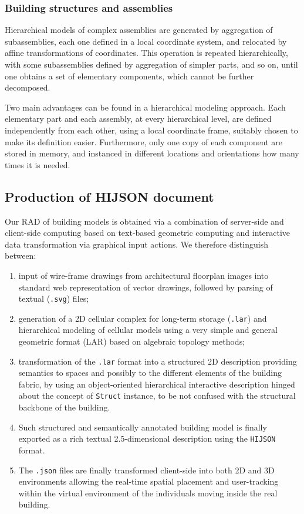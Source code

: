 \documentclass[]{egpubl}
\begin{document}
\subsubsection*{Building structures and assemblies}

Hierarchical models of complex assemblies are generated by aggregation
of subassemblies, each one defined in a local coordinate system, and
relocated by affine transformations of coordinates.  This operation
is repeated hierarchically, with some subassemblies defined by
aggregation of simpler parts, and so on, until one obtains a set of
elementary components, which cannot be further decomposed.

Two main advantages can be found in a hierarchical modeling approach. Each elementary part and each assembly, at every hierarchical level, are defined independently from each other, using a local coordinate frame, suitably chosen to make its definition easier. Furthermore, only one copy of each component are stored in memory, and instanced in different locations and orientations how many times it is needed.


\subsection{Production of HIJSON document}

Our RAD of building models is 
obtained via a combination of server-side and client-side computing
based on text-based geometric computing and interactive data 
transformation via graphical input actions. We therefore distinguish
between:

\begin{enumerate}
\def\labelenumi{(\alph{enumi})}
\item
  input of wire-frame drawings from architectural floorplan images into
  standard web representation of vector drawings, followed by parsing of textual (\texttt{.svg}) files;
\item
  generation of a 2D cellular complex for long-term storage
  (\texttt{.lar}) and hierarchical modeling of cellular models using a very simple and general geometric format (LAR) based on algebraic topology methods;
\item
  transformation of the \texttt{.lar} format into a structured 2D
  description providing semantics to spaces and possibly to the
  different elements of the building fabric, by using an object-oriented
  hierarchical interactive description hinged about the concept of
  \texttt{Struct} instance, to be not confused with the structural
  backbone of the building. 
\item
Such structured and semantically annotated
  building model is finally
  exported as a rich textual 2.5-dimensional description using the
  \texttt{HIJSON} format. 
\item
  The \texttt{.json} files are finally transformed client-side into both
  2D and 3D environments allowing the real-time spatial placement and
  user-tracking within the virtual environment of the individuals moving
  inside the real building.
\end{enumerate}
\end{document}
